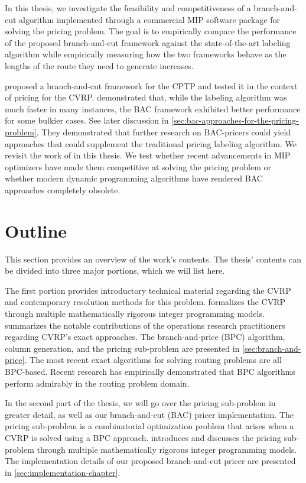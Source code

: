 In this thesis, we investigate the feasibility and competitiveness of a branch-and-cut algorithm implemented through a commercial MIP software package for solving the pricing problem.
The goal is to empirically compare the performance of the proposed branch-and-cut framework against the state-of-the-art labeling algorithm while empirically measuring how the two frameworks behave as the lengths of the route they need to generate increases.

\Textcite{jepsen2014} proposed a branch-and-cut framework for the CPTP and tested it in the context of pricing for the CVRP.
\Textcite{jepsen2014} demonstrated that, while the labeling algorithm was much faster in many instances, the BAC framework exhibited better performance for some bulkier cases.
See later discussion in \cref{sec:bac-approaches-for-the-pricing-problem}.
They demonstrated that further research on BAC-pricers could yield approaches that could supplement the traditional pricing labeling algorithm.
We revisit the work of \citeauthor{jepsen2014} in this thesis.
We test whether recent advancements in MIP optimizers have made them competitive at solving the pricing problem or whether modern dynamic programming algorithms have rendered BAC approaches completely obsolete.

\section{Outline}
\label{sec:intro-outline}

This section provides an overview of the work's contents.
The thesis' contents can be divided into three major portions, which we will list here.

The first portion provides introductory technical material
regarding the CVRP and contemporary resolution methods for this problem.
 formalizes the CVRP
through multiple mathematically rigorous integer programming models.
 summarizes the notable contributions
of the operations research practitioners regarding CVRP's exact approaches.
The branch-and-price (BPC) algorithm, column generation,
and the pricing sub-problem are presented in \cref{sec:branch-and-price}.
The most recent exact algorithms for solving routing problems are all BPC-based.
Recent research has empirically demonstrated that BPC algorithms
perform admirably in the routing problem domain.

In the second part of the thesis,
we will go over the pricing sub-problem in greater detail,
as well as our branch-and-cut (BAC) pricer implementation.
The pricing sub-problem is a combinatorial optimization problem
that arises when a CVRP is solved using a BPC approach.
 introduces and discusses the pricing sub-problem
through multiple mathematically rigorous integer programming models.
The implementation details of our proposed branch-and-cut pricer
are presented in \cref{sec:implementation-chapter}.

